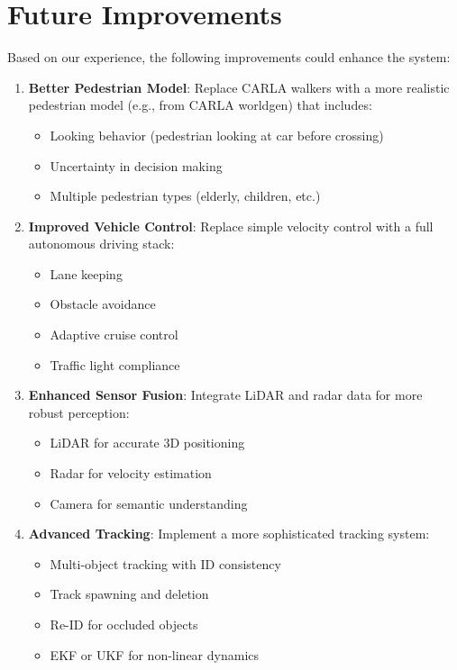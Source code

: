 \section{Future Improvements}

Based on our experience, the following improvements could enhance the system:

\begin{enumerate}
    \item \textbf{Better Pedestrian Model}: Replace CARLA walkers with a more realistic pedestrian model (e.g., from CARLA worldgen) that includes:
    \begin{itemize}
        \item Looking behavior (pedestrian looking at car before crossing)
        \item Uncertainty in decision making
        \item Multiple pedestrian types (elderly, children, etc.)
    \end{itemize}
    
    \item \textbf{Improved Vehicle Control}: Replace simple velocity control with a full autonomous driving stack:
    \begin{itemize}
        \item Lane keeping
        \item Obstacle avoidance
        \item Adaptive cruise control
        \item Traffic light compliance
    \end{itemize}
    
    \item \textbf{Enhanced Sensor Fusion}: Integrate LiDAR and radar data for more robust perception:
    \begin{itemize}
        \item LiDAR for accurate 3D positioning
        \item Radar for velocity estimation
        \item Camera for semantic understanding
    \end{itemize}
    
    \item \textbf{Advanced Tracking}: Implement a more sophisticated tracking system:
    \begin{itemize}
        \item Multi-object tracking with ID consistency
        \item Track spawning and deletion
        \item Re-ID for occluded objects
        \item EKF or UKF for non-linear dynamics
    \end{itemize}
    

\end{enumerate}
